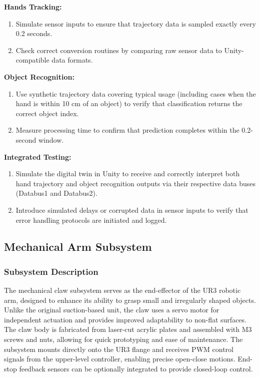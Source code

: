 \documentclass{senior-design}
\begin{document}
\textbf{Hands Tracking:} 
\begin{enumerate}
    \item Simulate sensor inputs to ensure that trajectory data is sampled exactly every 0.2 seconds. 
    \item Check correct conversion routines by comparing raw sensor data to Unity-compatible data formats. 
\end{enumerate}
 
\textbf{Object Recognition:} 
\begin{enumerate}
    \item Use synthetic trajectory data covering typical usage (including cases when the hand is within 10 cm of an object) to verify that classification returns the correct object index. 
    \item Measure processing time to confirm that prediction completes within the 0.2-second window. 
\end{enumerate}
 
\textbf{Integrated Testing:}
\begin{enumerate}
    \item Simulate the digital twin in Unity to receive and correctly interpret both hand trajectory and object recognition outputs via their respective data buses (Databus1 and Databus2). 
    \item Introduce simulated delays or corrupted data in sensor inputs to verify that error handling protocols are initiated and logged. 
\end{enumerate}
\subsection{Mechanical Arm Subsystem}
\subsubsection*{Subsystem Description}
The mechanical claw subsystem serves as the end-effector of the UR3 robotic arm, designed to enhance its ability to grasp small and irregularly shaped objects. Unlike the original suction-based unit, the claw uses a servo motor for independent actuation and provides improved adaptability to non-flat surfaces. The claw body is fabricated from laser-cut acrylic plates and assembled with M3 screws and nuts, allowing for quick prototyping and ease of maintenance. The subsystem mounts directly onto the UR3 flange and receives PWM control signals from the upper-level controller, enabling precise open-close motions. End-stop feedback sensors can be optionally integrated to provide closed-loop control. 
\end{document}
